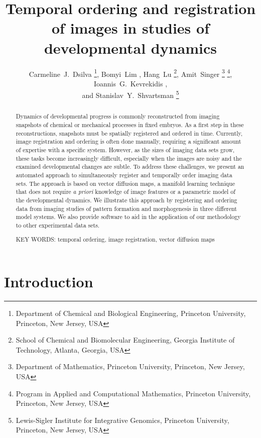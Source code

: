 \documentclass[twocolumn, 10pt]{article}
\title{Temporal ordering and registration of images in studies of developmental dynamics}
\author{Carmeline~J.~Dsilva \thanks{Department of Chemical and Biological Engineering, Princeton University, Princeton, New Jersey, USA},
Bomyi~Lim \footnotemark[1],
Hang~Lu \thanks{School of Chemical and Biomolecular Engineering, Georgia Institute of Technology, Atlanta, Georgia, USA},
Amit~Singer \thanks{Department of Mathematics, Princeton University, Princeton, New Jersey, USA} \thanks{Program in Applied and Computational Mathematics, Princeton University, Princeton, New Jersey, USA}, Ioannis~G.~Kevrekidis \footnotemark[1] \footnotemark[4] ,\\ and
Stanislav~Y.~Shvartsman \footnotemark[1] \thanks{Lewis-Sigler Institute for Integrative Genomics, Princeton University, Princeton, New Jersey, USA}}
\date{}
\begin{document}
\maketitle

\begin{abstract}

Dynamics of developmental progress is commonly reconstructed from imaging snapshots of chemical or mechanical processes in fixed embryos.
%
As a first step in these reconstructions, snapshots must be spatially registered and ordered in time.
%
Currently, image registration and ordering is often done manually, requiring a significant amount of expertise with a specific system.
%
However, as the sizes of imaging data sets grow, these tasks become increasingly difficult, especially when the images are noisy and the examined developmental changes are subtle.
%
To address these challenges, we present an automated approach to simultaneously register and temporally order imaging data sets.
%
The approach is based on vector diffusion maps, a manifold learning technique that does not require \textit{a priori} knowledge of image features or a parametric model of the developmental dynamics.
%
We illustrate this approach by registering and ordering data from imaging studies of pattern formation and morphogenesis in three different model systems.
%
We also provide software to aid in the application of our methodology to other experimental data sets.
\vspace{1em}

\noindent
KEY WORDS: temporal ordering, image registration, vector diffusion maps

\end{abstract}



\section*{Introduction}
\end{document}
